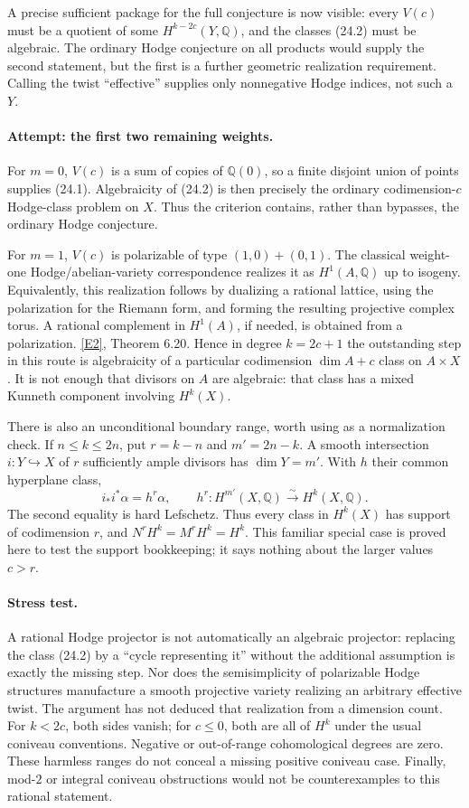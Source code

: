 \documentclass[11pt,a4paper]{article}
\newcommand{\Q}{\mathbb{Q}}
\newcommand{\eref}[2]{\hyperlink{extra:#1:#2}{[E#2]}}
\begin{document}
A precise sufficient package for the full conjecture is now visible:
every $V(c)$ must be a quotient of some $H^{k-2c}(Y,\Q)$, and the classes
(24.2) must be algebraic. The ordinary Hodge conjecture on all products
would supply the second statement, but the first is a further geometric
realization requirement. Calling the twist ``effective'' supplies only
nonnegative Hodge indices, not such a $Y$.

\paragraph{Attempt: the first two remaining weights.}
For $m=0$, $V(c)$ is a sum of copies of $\Q(0)$, so a finite disjoint union
of points supplies (24.1). Algebraicity of (24.2) is then precisely the
ordinary codimension-$c$ Hodge-class problem on $X$. Thus the criterion
contains, rather than bypasses, the ordinary Hodge conjecture.

For $m=1$, $V(c)$ is polarizable of type $(1,0)+(0,1)$. The classical
weight-one Hodge/abelian-variety correspondence realizes it as $H^1(A,\Q)$
up to isogeny. Equivalently, this realization follows by dualizing a
rational lattice, using the polarization for the Riemann form, and forming
the resulting projective complex torus. A rational complement in
$H^1(A)$, if needed, is obtained from a polarization. \eref{statement}{2}, Theorem 6.20.
Hence in degree $k=2c+1$ the outstanding step in this route is algebraicity
of a particular codimension $\dim A+c$ class on $A\times X$.
It is not enough that divisors on $A$ are algebraic: that class has a mixed
Kunneth component involving $H^k(X)$.

There is also an unconditional boundary range, worth using as a normalization
check. If $n\leq k\leq2n$, put $r=k-n$ and $m'=2n-k$. A smooth intersection
$i:Y\hookrightarrow X$ of $r$ sufficiently ample divisors has
$\dim Y=m'$. With $h$ their common hyperplane class,
\[
 i_*i^*\alpha=h^r\alpha,\qquad
 h^r:H^{m'}(X,\Q)\xrightarrow{\sim}H^k(X,\Q).
 \tag{24.4}
\]
The second equality is hard Lefschetz. Thus every class in $H^k(X)$ has
support of codimension $r$, and
$N^rH^k=M^rH^k=H^k$. This familiar special case is proved here to test the
support bookkeeping; it says nothing about the larger values $c>r$.

\paragraph{Stress test.}
A rational Hodge projector is not automatically an algebraic projector:
replacing the class (24.2) by a ``cycle representing it'' without the
additional assumption is exactly the missing step. Nor does the
semisimplicity of polarizable Hodge structures manufacture a smooth
projective variety realizing an arbitrary effective twist. The argument
has not deduced that realization from a dimension count.
For $k<2c$, both sides vanish; for $c\leq0$, both are all of $H^k$ under
the usual coniveau conventions. Negative or out-of-range cohomological
degrees are zero. These harmless ranges do not conceal a missing positive
coniveau case. Finally, mod-$2$ or integral coniveau obstructions would not
be counterexamples to this rational statement.
\end{document}
